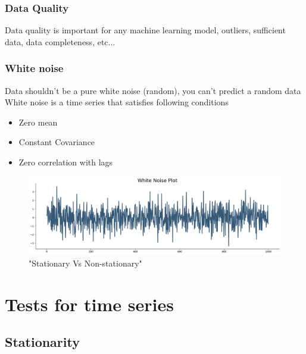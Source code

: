 \documentclass[12pt]{extarticle}
\begin{document}
\subsubsection{Data Quality}
Data quality is important for any machine learning model, outliers, sufficient
data, data completeness, etc...

\subsubsection{White noise}
Data shouldn't be a pure white noise (random), you can't predict a random data \\
White noise is a time series that satisfies following conditions
\begin{itemize}
    \item Zero mean
    \item Constant Covariance 
    \item Zero correlation with lags
\end{itemize}

\begin{figure}[H]
    \centering
    \includegraphics[width=0.5\linewidth]{images/timeseries3.png}
    \caption{"Stationary Vs Non-stationary"}
    \label{fig:enter-label}
\end{figure}

\section{Tests for time series}

\subsection*{Stationarity}
\end{document}
